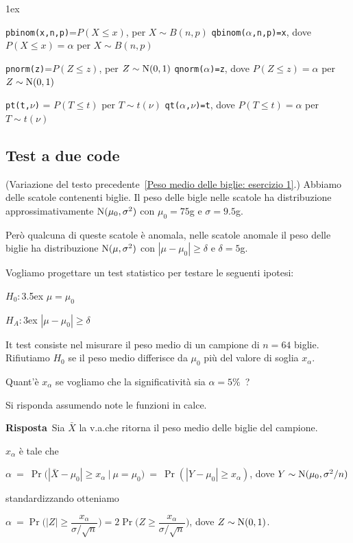 \documentclass[11pt,openany]{book}
\begin{document}
\vfill
\parskip1ex
{\hrulefill\scriptsize

{\tt pbinom(x,n,p)}=$P(X\le x)$, per $X\sim B(n,p)$
\hfill 
{\tt qbinom($\alpha$,n,p)=x},  dove $P(X\le x)=\alpha$ per $X\sim B(n,p)$

{\tt pnorm(z)}=$P(Z\le z)$, per $Z\sim {\rm N}(0,1)$
\hfill 
{\tt qnorm($\alpha$)=z},  dove $P(Z\le z)=\alpha$ per $Z\sim {\rm N}(0,1)$

{\tt pt(t,$\nu$)} = $P(T\le t)$ per $T\sim t(\nu)$
\hfill
{\tt qt($\alpha$,$\nu$)=t}, dove $P(T\le t)=\alpha$ per $T\sim t(\nu)$

}

\clearpage\subsection{Test a due code}

(Variazione del testo precedente~\ref{Peso medio delle biglie: esercizio 1}.) 
Abbiamo delle scatole contenenti biglie.
Il peso delle bigle nelle scatole ha distribuzione approssimativamente  ${\rm N}(\mu_0,\sigma^2)$ con $\mu_0=75$g e $\sigma=9.5$g. 

Però qualcuna di queste scatole è anomala, nelle scatole anomale il peso delle biglie ha distribuzione  ${\rm N}(\mu,\sigma^2)$ con $|\mu-\mu_0|\ge\delta$ e $\delta=5$g.

Vogliamo progettare un test statistico per testare le seguenti ipotesi:

$H_0:$\kern3.5ex $\mu=\mu_0$

$H_A:$\kern3ex $|\mu-\mu_0|\ge\delta$

It test consiste nel misurare il peso medio di un campione di $n=64$ biglie.
Rifiutiamo $H_0$ se il peso medio differisce da $\mu_0$ più del valore di soglia $x_\alpha$.

Quant'è $x_\alpha$ se vogliamo che la significatività sia  $\alpha=5\%$~?

Si risponda assumendo note le funzioni in calce.

\textbf{Risposta}\  Sia $\bar X$ la v.a.\@ che ritorna il peso medio delle biglie del campione.

$x_\alpha$ è tale che \medskip

$\alpha\ =\ \Pr\big(|\bar X-\mu_0|\ge x_\alpha\ \mathbin\big|\ \mu=\mu_0\big)\ =\ \Pr(|Y-\mu_0|\ge x_\alpha)$, dove $Y\sim {\rm N}(\mu_0,\sigma^2/n)$ \medskip

standardizzando otteniamo \medskip

$\alpha\ =\Pr\bigg(|Z|\ge \dfrac{x_\alpha}{\sigma/\sqrt n}\bigg)=2\Pr\bigg(Z\ge \dfrac{x_\alpha}{\sigma/\sqrt n}\bigg)$, dove $Z\sim {\rm N}(0,1)$.
\end{document}
